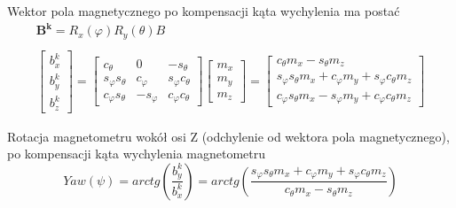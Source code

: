 Wektor pola magnetycznego po kompensacji kąta wychylenia ma postać
\begin{equation}
    \begin{array}{c}
        \mathbf{B^{k}} = R_x(\varphi)R_y(\theta)B 
        \\ \\
        \left[
            \begin{array}{c}
                b^k_x \\
                b^k_y \\
                b^k_z
            \end{array}
        \right]
        =
        \left[
            \begin{array}{ccc}
                c_{\theta} & 0 & -s_{\theta} \\
                s_{\varphi}s_{\theta} & c_{\varphi} & s_{\varphi}c_{\theta} \\
                c_{\varphi}s_{\theta} & -s_{\varphi} & c_{\varphi}c_{\theta}
            \end{array}
        \right]
        \left[
            \begin{array}{c}
                m_x \\
                m_y \\
                m_z
            \end{array}
        \right]
        =
        \left[
            \begin{array}{c}
                c_{\theta}m_x - s_{\theta}m_z \\
                s_{\varphi}s_{\theta}m_x + c_{\varphi}m_y + s_{\varphi}c_{\theta}m_z \\
                c_{\varphi}s_{\theta}m_x - s_{\varphi}m_y + c_{\varphi}c_{\theta}m_z
            \end{array}
        \right]
    \end{array}
\end{equation}

Rotacja magnetometru wokół osi Z (odchylenie od wektora pola magnetycznego), po kompensacji kąta wychylenia magnetometru
\begin{equation}
    Yaw(\psi) = arctg\left(\frac{b^k_y}{b^k_x}\right) = arctg\left(\frac{s_{\varphi}s_{\theta}m_x + c_{\varphi}m_y + s_{\varphi}c_{\theta}m_z}{c_{\theta}m_x - s_{\theta}m_z}\right)
    \label{Odchylenie po kompensacji}
\end{equation}

